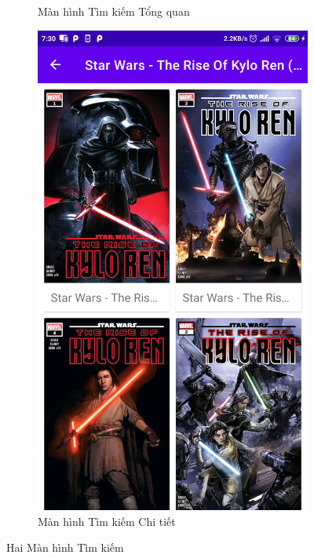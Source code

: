 \documentclass[../../thesis]{subfiles}
\begin{document}
\begin{figure}[H]
\begin{subfigure}[b]{0.49\textwidth}
        \caption{Màn hình Tìm kiếm Tổng quan}
        \label{fig:search_overall_screen}
    \end{subfigure}
    \hfill
    \begin{subfigure}[b]{0.49\textwidth}
        \centering
        \includegraphics[scale=0.12]{../images/Screenshot_2021-05-25-07-30-42-216_com.uet.nvmnghia.yacv}
        \caption{Màn hình Tìm kiếm Chi tiết}
        \label{fig:search_detail_screen}
    \end{subfigure}
    \caption{Hai Màn hình Tìm kiếm}
    \label{fig:2-searching-screens}
\end{figure}
\end{document}

